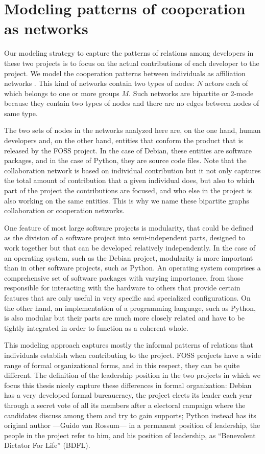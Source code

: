 \section{Modeling patterns of cooperation as networks}

Our modeling strategy to capture the patterns of relations among developers in these two projects is to focus on the actual contributions of each developer to the project. We model the cooperation patterns between individuals as affiliation networks \citep[chapter 8]{wasserman:1994}. This kind of networks contain two types of nodes: $N$ actors each of which belongs to one or more groups $M$. Such networks are bipartite or 2-mode because they contain two types of nodes and there are no edges between nodes of same type.

The two sets of nodes in the networks analyzed here are, on the one hand, human developers and, on the other hand, entities that conform the product that is released by the FOSS project. In the case of Debian, these entities are software packages, and in the case of Python, they are source code files. Note that the collaboration network is based on individual contribution but it not only captures the total amount of contribution that a given individual does, but also to which part of the project the contributions are focused, and who else in the project is also working on the same entities. This is why we name these bipartite graphs collaboration or cooperation networks.

One feature of most large software projects is modularity, that could be defined as the division of a software project into semi-independent parts, designed to work together but that can be developed relatively independently. In the case of an operating system, such as the Debian project, modularity is more important than in other software projects, such as Python. An operating system comprises a comprehensive set of software packages with varying importance, from those responsible for interacting with the hardware to others that provide certain features that are only useful in very specific and specialized configurations. On the other hand, an implementation of a programming language, such as Python, is also modular but their parts are much more closely related and have to be tightly integrated in order to function as a coherent whole.

This modeling approach captures mostly the informal patterns of relations that individuals establish when contributing to the project. FOSS projects have a wide range of formal organizational forms, and in this respect, they can be quite different. The definition of the leadership position in the two projects in which we focus this thesis nicely capture these differences in formal organization: Debian has a very developed formal bureaucracy, the project elects its leader each year through a secret vote of all its members after a electoral campaign where the candidates discuss among them and try to gain supports; Python instead has its original author ---Guido van Rossum--- in a permanent position of leadership, the people in the project refer to him, and his position of leadership, as ``Benevolent Dictator For Life'' (BDFL).

